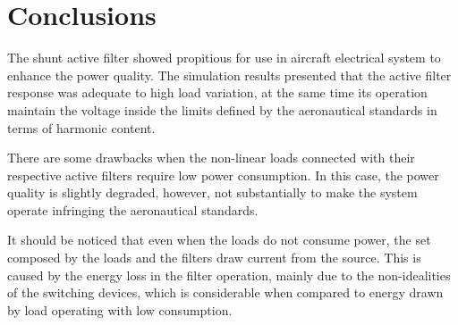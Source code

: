 \section{Conclusions}

The shunt active filter showed propitious for use in aircraft electrical system to enhance the power quality. The simulation results presented that the active filter response was adequate to high load variation, at the same time its operation maintain the voltage inside the limits defined by the aeronautical standards in terms of harmonic content.

There are some drawbacks when the non-linear loads connected with their respective active filters require low power consumption. In this case, the power quality is slightly degraded, however, not substantially to make the system operate infringing the aeronautical standards.

It should be noticed that even when the loads do not consume power, the set composed by the loads and the filters draw current from the source. This is caused by the energy loss in the filter operation, mainly due to the non-idealities of the switching devices, which is considerable when compared to energy drawn by load operating with low consumption.


